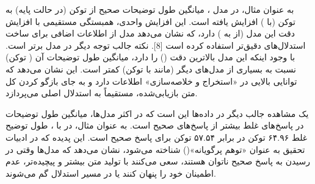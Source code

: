 \documentclass[12pt,a4paper]{report}
\begin{document}
به عنوان مثال، در مدل ، میانگین طول توضیحات صحیح از  توکن (در حالت پایه) به  توکن (با ) افزایش یافته است. این افزایش  واحدی، همبستگی مستقیمی با افزایش دقت این مدل (از  به ) دارد، که نشان می‌دهد مدل از اطلاعات اضافی برای ساخت استدلال‌های دقیق‌تر استفاده کرده است [8]. نکته جالب توجه دیگر در مدل برتر  است. با وجود اینکه این مدل بالاترین دقت () را دارد، میانگین طول توضیحات آن ( توکن) نسبت به بسیاری از مدل‌های دیگر (مانند  با  توکن) کمتر است. این نشان می‌دهد که  توانایی بالایی در «استخراج و خلاصه‌سازی» اطلاعات دارد و به جای بازگو کردن کل متن بازیابی‌شده، مستقیماً به استدلال اصلی می‌پردازد.
	
	یک مشاهده جالب دیگر در داده‌ها این است که در اکثر مدل‌ها، میانگین طول توضیحات در پاسخ‌های غلط بیشتر از پاسخ‌های صحیح است. به عنوان مثال، در  با ، طول توضیح غلط ۶۴.۹۶ توکن در برابر ۵۷.۵۴ توکن برای پاسخ صحیح است. این پدیده که در ادبیات تحقیق به عنوان «توهم پرگویانه»() شناخته می‌شود، نشان می‌دهد که مدل‌ها وقتی در رسیدن به پاسخ صحیح ناتوان هستند، سعی می‌کنند با تولید متن بیشتر و پیچیده‌تر، عدم اطمینان خود را پنهان کنند یا در مسیر استدلال گم می‌شوند.
	
	
\end{document}
